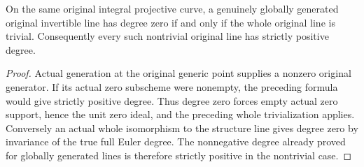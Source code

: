 \begin{theorem}
\label{thm:fc-original-generated-line-degree-zero-trivial}
\leanok
{}
On the same original integral projective curve, a genuinely globally
generated original invertible line has degree zero if and only if the
whole original line is trivial.  Consequently every such nontrivial
original line has strictly positive degree.
\end{theorem}
\begin{proof}
Actual generation at the original generic point supplies a nonzero
original generator.  If its actual zero subscheme were nonempty, the
preceding formula would give strictly positive degree.  Thus degree zero
forces empty actual zero support, hence the unit zero ideal, and the
preceding whole trivialization applies.  Conversely an actual whole
isomorphism to the structure line gives degree zero by invariance of the
true full Euler degree.  The nonnegative degree already proved for
globally generated lines is therefore strictly positive in the
nontrivial case.
\end{proof}
